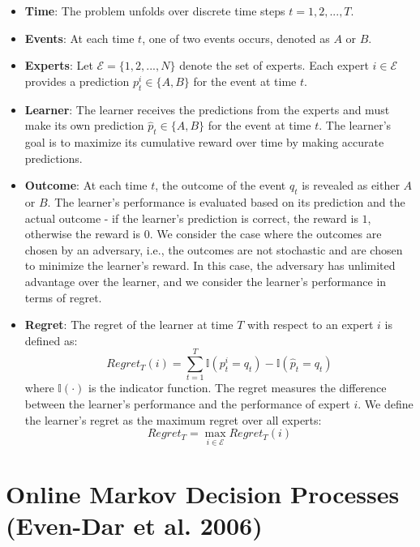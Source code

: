 \documentclass[a4paper, 12pt]{article}
\begin{document}
\begin{itemize}
    \item \textbf{Time}: The problem unfolds over discrete time steps $t = 1, 2, ..., T$.

    \item \textbf{Events}: At each time $t$, one of two events occurs, denoted as $A$ or $B$.

    \item \textbf{Experts}: Let $\mathcal{E} = \{1, 2, ..., N\}$ denote the set of experts. 
    Each expert $i \in \mathcal{E}$ provides a prediction $p_t^i \in \{A, B\}$ for the event at time $t$.
    
    \item \textbf{Learner}: The learner receives the predictions from the experts and must make its own prediction $\hat{p}_t \in \{A, B\}$ 
    for the event at time $t$.  The learner's goal is to maximize its cumulative reward over time by making accurate predictions.
    
    \item \textbf{Outcome}: At each time $t$, the outcome of the event $q_t$ is revealed as either $A$ or $B$. 
    The learner's performance is evaluated based on its prediction and the actual outcome - if the learner's prediction is correct, 
    the reward is $1$, otherwise the reward is $0$.
    We consider the case where the outcomes are chosen by an adversary, i.e., the outcomes are not stochastic and are chosen to minimize 
    the learner's reward.
    In this case, the adversary has unlimited advantage over the learner, and we consider the learner's performance in terms of regret.

    \item \textbf{Regret}: The regret of the learner at time $T$ with respect to an expert $i$ is defined as:
    \[
    Regret_T(i) = \sum_{t=1}^T \mathbb{I}(p_t^i = q_t) - \mathbb{I}(\hat{p}_t = q_t) 
    \]
    where $\mathbb{I}(\cdot)$ is the indicator function. The regret measures the difference between the learner's performance 
    and the performance of expert $i$.
    We define the learner's regret as the maximum regret over all experts:
    \[
    Regret_T = \max_{i \in \mathcal{E}} Regret_T(i)
    \]

\end{itemize}


\section*{Online Markov Decision Processes (Even-Dar et al. 2006)}
\end{document}
